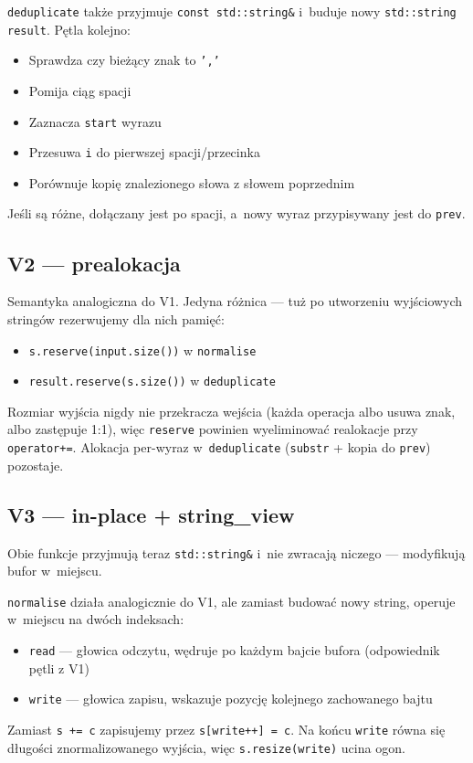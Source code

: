\documentclass[11pt,a4paper]{article}
\begin{document}
\texttt{deduplicate} także przyjmuje \texttt{const std::string\&} i~buduje nowy \texttt{std::string result}. Pętla kolejno:
\begin{itemize}
    \item Sprawdza czy bieżący znak to \texttt{','}
    \item Pomija ciąg spacji
    \item Zaznacza \texttt{start} wyrazu
    \item Przesuwa \texttt{i} do pierwszej spacji/przecinka
    \item Porównuje kopię znalezionego słowa z słowem poprzednim
\end{itemize}
Jeśli są różne, dołączany jest po spacji, a~nowy wyraz przypisywany jest do \texttt{prev}.

\subsection{V2 --- prealokacja}
Semantyka analogiczna do V1. Jedyna różnica --- tuż po utworzeniu wyjściowych stringów rezerwujemy dla nich pamięć:
\begin{itemize}
    \item \texttt{s.reserve(input.size())} w \texttt{normalise}
    \item \texttt{result.reserve(s.size())} w \texttt{deduplicate}
\end{itemize}
Rozmiar wyjścia nigdy nie przekracza wejścia (każda operacja albo usuwa znak, albo zastępuje 1:1), więc \texttt{reserve} powinien wyeliminować realokacje przy \texttt{operator+=}. Alokacja per-wyraz w~\texttt{deduplicate} (\texttt{substr} + kopia do \texttt{prev}) pozostaje.

\subsection{V3 --- in-place + string\_view}
Obie funkcje przyjmują teraz \texttt{std::string\&} i~nie zwracają niczego --- modyfikują bufor w~miejscu.

\texttt{normalise} działa analogicznie do V1, ale zamiast budować nowy string, operuje w~miejscu na dwóch indeksach:
\begin{itemize}
    \item \texttt{read} --- głowica odczytu, wędruje po każdym bajcie bufora (odpowiednik pętli z V1)
    \item \texttt{write} --- głowica zapisu, wskazuje pozycję kolejnego zachowanego bajtu
\end{itemize}
Zamiast \texttt{s += c} zapisujemy przez \texttt{s[write++] = c}. Na końcu \texttt{write} równa się długości znormalizowanego wyjścia, więc \texttt{s.resize(write)} ucina ogon.
\end{document}

